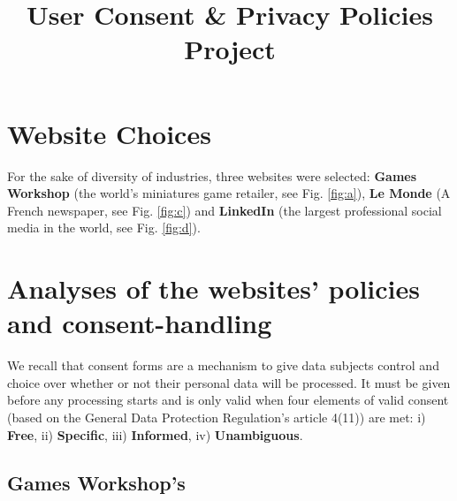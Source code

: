 \documentclass[twocolumn, letterpaper]{scrartcl}
\begin{document}
    \title{\color{seablue}User Consent \& Privacy Policies Project}

	\maketitle
	
    
    
    \section*{Website Choices}
        
         For the sake of diversity of industries, three websites were selected: \textbf{Games Workshop}\cite{GW} (the world's miniatures game retailer, see Fig. \ref{fig:a}), \textbf{Le Monde}\cite{LM} (A French newspaper, see Fig. \ref{fig:c}) and \textbf{LinkedIn}\cite{LD} (the largest professional social media in the world, see Fig. \ref{fig:d}).
	
	\section{Analyses of the websites' policies and consent-handling}
	
	    We recall that consent forms are a mechanism to give data subjects control and choice over whether or not their personal data will be processed. It must be given before any processing starts and is only valid when four elements of valid consent (based on the General Data Protection Regulation's article 4(11)) are met: i) \textbf{Free}, ii) \textbf{Specific}, iii) \textbf{Informed}, iv) \textbf{Unambiguous}.
	
    \subsection*{Games Workshop's}
\end{document}
